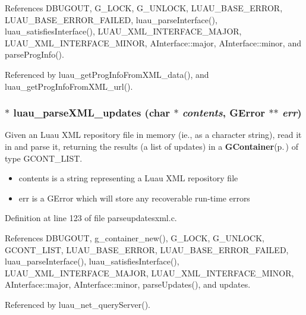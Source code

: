 References DBUGOUT, G\_\-LOCK, G\_\-UNLOCK, LUAU\_\-BASE\_\-ERROR, LUAU\_\-BASE\_\-ERROR\_\-FAILED, luau\_\-parse\-Interface(), luau\_\-satisfies\-Interface(), LUAU\_\-XML\_\-INTERFACE\_\-MAJOR, LUAU\_\-XML\_\-INTERFACE\_\-MINOR, AInterface::major, AInterface::minor, and parse\-Prog\-Info().

Referenced by luau\_\-get\-Prog\-Info\-From\-XML\_\-data(), and luau\_\-get\-Prog\-Info\-From\-XML\_\-url().
\subsubsection{$\ast$ luau\_\-parse\-XML\_\-updates (char $\ast$ {\em contents}, GError $\ast$$\ast$ {\em err})}\label{parseupdates_8h_a0}


Given an Luau XML repository file in memory (ie., as a character string), read it in and parse it, returning the results (a list of updates) in a {\bf GContainer}{\rm (p.\,\pageref{structGContainer})} of type GCONT\_\-LIST.

\begin{itemize}
\item contents is a string representing a Luau XML repository file \item err is a GError which will store any recoverable run-time errors 
\end{itemize}


Definition at line 123 of file parseupdatesxml.c.

References DBUGOUT, g\_\-container\_\-new(), G\_\-LOCK, G\_\-UNLOCK, GCONT\_\-LIST, LUAU\_\-BASE\_\-ERROR, LUAU\_\-BASE\_\-ERROR\_\-FAILED, luau\_\-parse\-Interface(), luau\_\-satisfies\-Interface(), LUAU\_\-XML\_\-INTERFACE\_\-MAJOR, LUAU\_\-XML\_\-INTERFACE\_\-MINOR, AInterface::major, AInterface::minor, parse\-Updates(), and updates.

Referenced by luau\_\-net\_\-query\-Server().